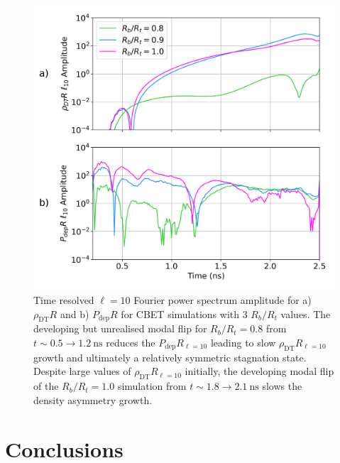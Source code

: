 \begin{figure}[t!]
    \includegraphics[width=0.75\linewidth]{Results1/Images/RbRts_mode10_growth.png}
    \centering
    \caption{Time resolved $\ell=10$ Fourier power spectrum amplitude for a) $\rho_{\text{DT}}R$ and b) $P_{\text{dep}}R$ for \ac{CBET} simulations with 3 $R_b/R_t$ values.
    The developing but unrealised modal flip for $R_b/R_t=0.8$ from $t \sim 0.5\rightarrow 1.2\ \text{ns}$ reduces the $P_{\text{dep}}R_{\ell=10}$ leading to slow $\rho_{\text{DT}}R_{\ell=10}$ growth and ultimately a relatively symmetric stagnation state.
    Despite large values of $\rho_{\text{DT}}R_{\ell=10}$ initially, the developing modal flip of the $R_b/R_t=1.0$ simulation from $t \sim 1.8\rightarrow 2.1\ \text{ns}$ slows the density asymmetry growth.}%
    \label{fig:Res1_mode10_growths}
\end{figure}


\section{Conclusions}%
\label{sec:Res1_Conclusions}


